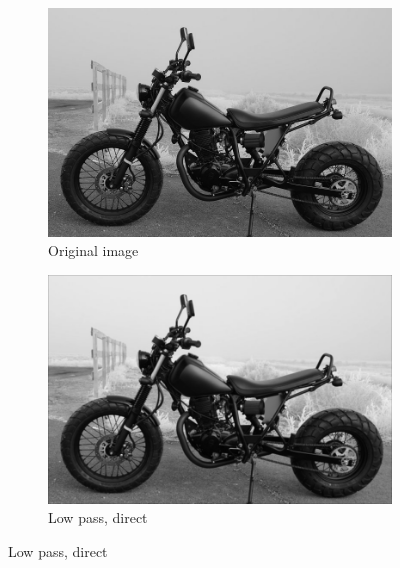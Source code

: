 \documentclass{beamer}
\begin{document}
\begin{frame}
\begin{figure}[h] \centering 
\begin{subfigure}[b]{0.4\textwidth} \includegraphics[width=\textwidth]{motor_original.png} \caption{Original image} %
\end{subfigure}
\begin{subfigure}[b]{0.4\textwidth} \includegraphics[width=\textwidth]{motor_direct.png} \caption{Low pass, direct}\end{subfigure}


\end{figure}
\end{frame}
\end{document}
